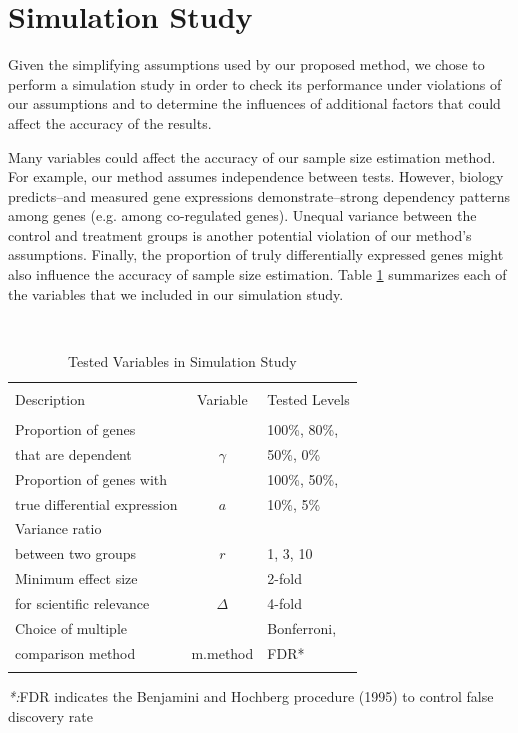 \documentclass{bioinfo}
\begin{document}
\section{Simulation Study}

Given the simplifying assumptions used by our proposed method, we
chose to perform a simulation study in order to check its
performance under violations of our assumptions and to determine the
influences of additional factors that could affect the accuracy of
the results.

Many variables could affect the accuracy of our sample size
estimation method. For example, our method assumes independence
between tests. However, biology predicts--and measured gene
expressions demonstrate--strong dependency patterns among genes
(e.g. among co-regulated genes).  Unequal variance between the
control and treatment groups is another potential violation of our
method's assumptions. Finally, the proportion of truly
differentially expressed genes might also influence the accuracy of
sample size estimation.  Table \ref{tb:SimuVariables} summarizes
each of the variables that we included in our simulation study.

\begin{table}\centering
  \caption{Tested Variables in Simulation Study}\ \\
  \begin{tabular}{lcl}
    \hline\hline
    \\
    Description & Variable & Tested Levels \\
    \\
    \hline\hline
    Proportion of genes &          & 100\%, 80\%,  \\
    that are dependent  & $\gamma$ & 50\%,   0\%    \\
    \hline
    Proportion of genes with     &     &  100\%, 50\%,\\
    true differential expression & $a$ &   10\%,  5\% \\
    \hline
    Variance ratio &  &\\
    between two groups & $r$ & 1, 3, 10  \\
    \hline
    Minimum effect size  & &2-fold \\
    for scientific relevance & $\Delta$ & 4-fold \\
    \hline
    Choice of multiple  & & Bonferroni,  \\
    comparison method & m.method & FDR* \\
    \hline\hline\\
  \end{tabular}
  \emph{*:}FDR indicates the Benjamini and Hochberg procedure (1995) to
    control false discovery rate
  \label{tb:SimuVariables}
\end{table}
\end{document}
